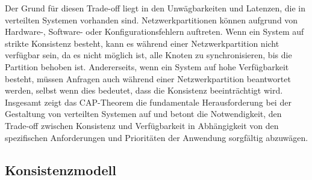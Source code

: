 \documentclass[../vs-script-first-v01.tex]{subfiles}
\begin{document}
Der Grund für diesen Trade-off liegt in den Unwägbarkeiten und Latenzen, die in verteilten Systemen vorhanden sind. Netzwerkpartitionen können aufgrund von Hardware-, Software- oder Konfigurationsfehlern auftreten. Wenn ein System auf strikte Konsistenz besteht, kann es während einer Netzwerkpartition nicht verfügbar sein, da es nicht möglich ist, alle Knoten zu synchronisieren, bis die Partition behoben ist. Andererseits, wenn ein System auf hohe Verfügbarkeit besteht, müssen Anfragen auch während einer Netzwerkpartition beantwortet werden, selbst wenn dies bedeutet, dass die Konsistenz beeinträchtigt wird.
Insgesamt zeigt das CAP-Theorem die fundamentale Herausforderung bei der Gestaltung von verteilten Systemen auf und betont die Notwendigkeit, den Trade-off zwischen Konsistenz und Verfügbarkeit in Abhängigkeit von den spezifischen Anforderungen und Prioritäten der Anwendung sorgfältig abzuwägen.

\subsection{Konsistenzmodell}
\end{document}
